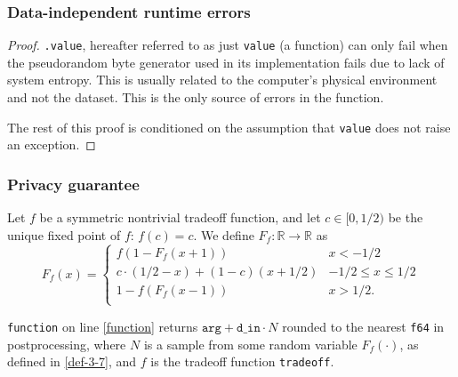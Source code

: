 \documentclass{article}
\begin{document}
\begin{theorem}
    \label{valid-measurement}
\end{theorem}

\subsubsection*{Data-independent runtime errors}
\begin{proof}
\texttt{.value}, 
hereafter referred to as just \texttt{value} (a function) 
can only fail when the pseudorandom byte generator used in its implementation fails due to lack of system entropy. 
This is usually related to the computer's physical environment and not the dataset. 
This is the only source of errors in the function.

The rest of this proof is conditioned on the assumption that \texttt{value} does not raise an exception.
\end{proof}
\subsubsection*{Privacy guarantee}

\begin{definition}
    \label{def-3-7}  %
    Let $f$ be a symmetric nontrivial tradeoff function, and let {$c\in [0,1/2)$} be the unique fixed point of $f$: $f(c)=c$. 
    We define $F_f:\mathbb{R}\rightarrow \mathbb{R}$ as  \[ F_f(x) = \begin{cases}
        f(1-F_f(x+1))&x<-1/2\\
        c \cdot (1/2-x) + (1-c)(x+1/2)&-1/2\leq x\leq 1/2\\
        1-f(F_f(x-1))&x>1/2.\\
    \end{cases}\]
\end{definition}

\begin{lemma}
    \label{function-correctness}
    \texttt{function} on line \ref{function} returns $\texttt{arg} + \texttt{d\_in} \cdot N$ 
    rounded to the nearest \texttt{f64} in postprocessing,
    where $N$ is a sample from some random variable $F_f(\cdot)$, as defined in \ref{def-3-7},
    and $f$ is the tradeoff function \texttt{tradeoff}.
\end{lemma}
\end{document}
